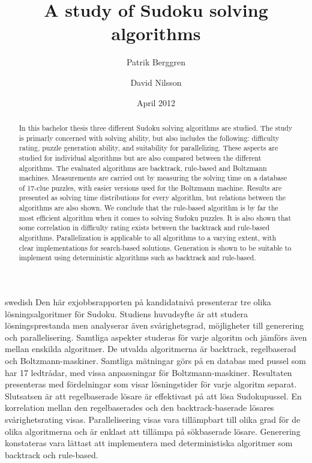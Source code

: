 \documentclass[a4paper,11pt]{kth-mag}
\title{A study of Sudoku solving algorithms}
\subtitle{}
\author{Patrik Berggren \and David Nilsson}
\date{April 2012}
\begin{document}
\frontmatter
\pagestyle{empty}
\removepagenumbers
\maketitle
{}
\begin{abstract}
In this bachelor thesis three different Sudoku solving algorithms are studied.
The study is primarly concerned with solving ability, but also includes the following: difficulty rating, puzzle generation ability, and suitability for parallelizing.
These aspects are studied for individual algorithms but are also compared between the different algorithms.
The evaluated algorithms are backtrack, rule-based and Boltzmann machines.
Measurements are carried out by measuring the solving time on a database of 17-clue puzzles, with easier versions used for the Boltzmann machine.
Results are presented as solving time distributions for every algorithm, but relations between the algorithms are also shown.
We conclude that the rule-based algorithm is by far the most efficient algorithm when it comes to solving Sudoku puzzles.
It is also shown that some correlation in difficulty rating exists between the backtrack and rule-based algorithms.
Parallelization is applicable to all algorithms to a varying extent, with clear implementations for search-based solutions.
Generation is shown to be suitable to implement using deterministic algorithms such as backtrack and rule-based.

\end{abstract}
\clearpage
\begin{foreignabstract}{swedish}
Den här exjobbsrapporten på kandidatnivå presenterar tre olika lösningsalgoritmer för Sudoku.
Studiens huvudsyfte är att studera lösningsprestanda men analyserar även svårighetsgrad, möjligheter till generering och parallelisering.
Samtliga aspekter studeras för varje algoritm och jämförs även mellan enskilda algoritmer.
De utvalda algoritmerna är backtrack, regelbaserad och Boltzmann-maskiner.
Samtliga mätningar görs på en databas med pussel som har 17 ledtrådar, med vissa anpassningar för Boltzmann-maskiner.
Resultaten presenteras med fördelningar som visar lösningstider för varje algoritm separat. 
Slutsatsen är att regelbaserade lösare är effektivast på att lösa Sudokupussel.
En korrelation mellan den regelbaserades och den backtrack-baserade lösares svårighetsrating visas.
Parallelisering visas vara tillämpbart till olika grad för de olika algoritmerna och är enklast att tillämpa på sökbaserade lösare.
Generering konstateras vara lättast att implementera med deterministiska algoritmer som backtrack och rule-based.
\end{foreignabstract}
\clearpage
\end{document}
